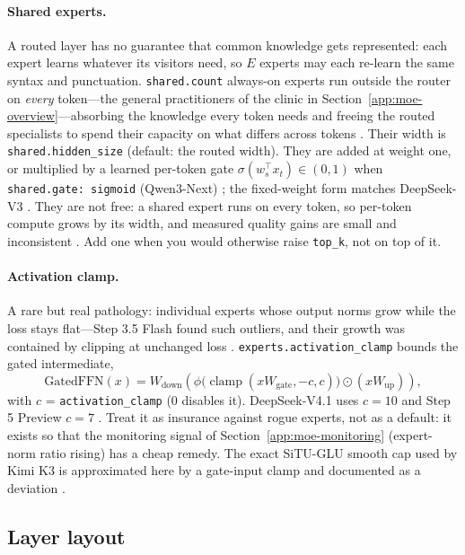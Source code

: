 \paragraph{Shared experts.}
A routed layer has no guarantee that common knowledge gets represented: each
expert learns whatever its visitors need, so $E$ experts may each re-learn
the same syntax and punctuation. \texttt{shared.count} always-on experts run
outside the router on \emph{every} token---the general practitioners of the
clinic in Section~\ref{app:moe-overview}---absorbing the knowledge every
token needs and freeing the routed specialists to spend their capacity on
what differs across tokens \citep{dai2024deepseekmoe}. Their width is
\texttt{shared.hidden\_size} (default: the routed width). They are added at
weight one, or multiplied by a learned per-token gate
$\sigma(w_s^{\top} x_t) \in (0,1)$ when \texttt{shared.gate: sigmoid}
(Qwen3-Next) \citep{qwen2025qwen3}; the fixed-weight form matches
DeepSeek-V3 \citep{deepseek2024v3}. They are not free: a shared expert runs
on every token, so per-token compute grows by its width, and measured
quality gains are small and inconsistent \citep{li2026slicing}. Add one when
you would otherwise raise \texttt{top\_k}, not on top of it.

\paragraph{Activation clamp.}
A rare but real pathology: individual experts whose output norms grow while
the loss stays flat---Step 3.5 Flash found such outliers, and their growth
was contained by clipping at unchanged loss \citep{huang2026step35}.
\texttt{experts.activation\_clamp} bounds the gated intermediate,
\begin{equation}
  \mathrm{GatedFFN}(x) = W_{\text{down}}\!\left(
  \phi\bigl(\operatorname{clamp}(xW_{\text{gate}}, -c, c)\bigr) \odot (xW_{\text{up}})
  \right),
\end{equation}
with $c$ = \texttt{activation\_clamp} ($0$ disables it). DeepSeek-V4.1 uses
$c = 10$ and Step 5 Preview $c = 7$ \citep{deepseek2026v4flash}. Treat it as
insurance against rogue experts, not as a default: it exists so that the
monitoring signal of Section~\ref{app:moe-monitoring} (expert-norm ratio
rising) has a cheap remedy. The exact SiTU-GLU smooth cap used by Kimi K3 is
approximated here by a gate-input clamp and documented as a deviation
\citep{kimiteam2026k3}.

\subsection{Layer layout}
\label{app:moe-layout}

